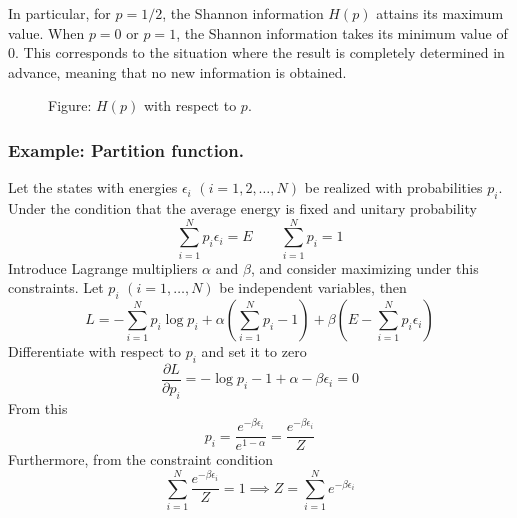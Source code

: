 \documentclass[../../../main.tex]{subfiles}
\begin{document}
In particular, for \( p = 1/2 \), the Shannon information \( H(p) \) attains its maximum value. When \( p = 0 \) or \( p = 1 \), the Shannon information takes its minimum value of 0.
This corresponds to the situation where the result is completely determined in advance, meaning that no new information is obtained.

\begin{figure}
  \centering
  \caption*{Figure: $H(p)$ with respect to $p$.}
\end{figure}

\subsubsection{Example: Partition function.}
Let the states with energies $\epsilon_i$ $(i = 1,2,\dots,N)$ be realized with probabilities $p_i$.
Under the condition that the average energy is fixed and unitary probability
\begin{equation*}
  \sum_{i=1}^{N} p_i \epsilon_i = E
  \qquad
  \sum_{i=1}^{N} p_i = 1
\end{equation*}
Introduce Lagrange multipliers $\alpha$ and $\beta$, and consider maximizing under this constraints.
Let $p_i$ $(i=1,\dots,N)$ be independent variables, then
\begin{equation*}
  L = -\sum_{i=1}^{N} p_i \log p_i
  + \alpha \left(\sum_{i=1}^{N} p_i - 1\right)
  + \beta \left(E - \sum_{i=1}^{N} p_i \epsilon_i \right)
\end{equation*}
Differentiate with respect to $p_i$ and set it to zero
\begin{equation*}
  \frac{\partial L}{\partial p_i} = -\log p_i - 1 + \alpha - \beta \epsilon_i = 0
\end{equation*}
From this
\begin{equation*}
  p_i = \frac{e^{-\beta \epsilon_i}}{e^{1-\alpha}}= \frac{e^{-\beta \epsilon_i}}{Z}
\end{equation*}
Furthermore, from the constraint condition
\begin{equation*}
  \sum_{i=1}^{N} \frac{e^{-\beta \epsilon_i}}{Z}  =  1\implies
  Z  =  \sum_{i=1}^{N} e^{-\beta \epsilon_i}
\end{equation*}
\end{document}
